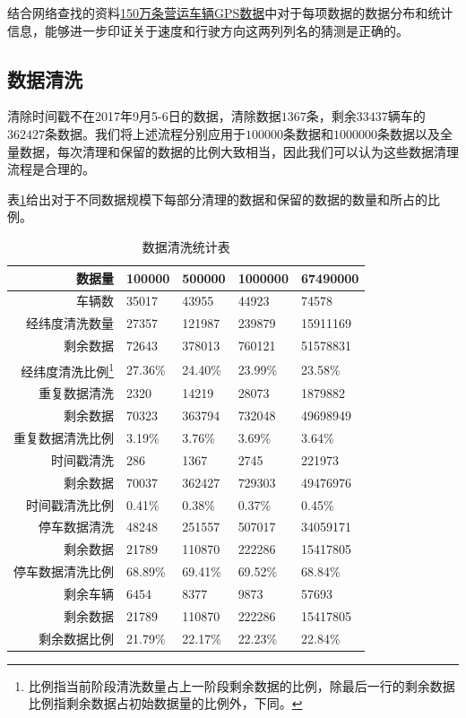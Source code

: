 \documentclass[UTF8]{ctexart}
\begin{document}
结合网络查找的资料\href{https://www.heywhale.com/mw/dataset/5f75ad252b83e00030b3f91d/file}{150万条营运车辆GPS数据}中对于每项数据的数据分布和统计信息，能够进一步印证关于速度和行驶方向这两列列名的猜测是正确的。

\subsection{数据清洗}

清除时间戳不在2017年9月5-6日的数据，清除数据$1367$条，剩余$33437$辆车的$362427$条数据。我们将上述流程分别应用于$100000$条数据和$1000000$条数据以及全量数据，每次清理和保留的数据的比例大致相当，因此我们可以认为这些数据清理流程是合理的。

表\ref{data}给出对于不同数据规模下每部分清理的数据和保留的数据的数量和所占的比例。
\begin{table}[ht]
    \begin{center}
        \caption{数据清洗统计表}
        \label{data}
    \begin{minipage}{\textwidth}
    \centering
    \begin{tabular}{r|l|l|l|l}
        \hline \hline
    \textbf{数据量} & \textbf{100000} & \textbf{500000} & \textbf{1000000} & \textbf{67490000} \\ \hline
    车辆数 & 35017 & 43955 & 44923 & 74578 \\ \hline \hline
    经纬度清洗数量 & 27357 & 121987 & 239879 & 15911169 \\ \hline 
    剩余数据 & 72643 & 378013 & 760121 & 51578831 \\ \hline
    经纬度清洗比例\footnote{比例指当前阶段清洗数量占上一阶段剩余数据的比例，除最后一行的剩余数据比例指剩余数据占初始数据量的比例外，下同。} & 27.36\% & 24.40\% & 23.99\% & 23.58\% \\ \hline \hline
    重复数据清洗 & 2320 & 14219 & 28073 & 1879882 \\ \hline
    剩余数据 & 70323 & 363794 & 732048 & 49698949 \\ \hline
    重复数据清洗比例 & 3.19\% & 3.76\% & 3.69\% & 3.64\% \\ \hline \hline
    时间戳清洗 & 286 & 1367 & 2745 & 221973 \\ \hline
    剩余数据 & 70037 & 362427 & 729303 & 49476976 \\ \hline
    时间戳清洗比例 & 0.41\% & 0.38\% & 0.37\% & 0.45\% \\ \hline \hline
    停车数据清洗 & 48248 & 251557 & 507017 & 34059171 \\ \hline
    剩余数据 & 21789 & 110870 & 222286 & 15417805 \\ \hline
    停车数据清洗比例 & 68.89\% & 69.41\% & 69.52\% & 68.84\% \\ \hline \hline
    剩余车辆 & 6454 & 8377 & 9873 & 57693 \\ \hline
    剩余数据 & 21789 & 110870 & 222286 & 15417805 \\ \hline
    剩余数据比例 & 21.79\% & 22.17\% & 22.23\% & 22.84\% \\ 
    \hline \hline
    \end{tabular}
    \end{minipage}    


\end{center}
\end{table}
\end{document}
